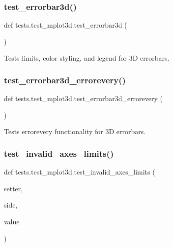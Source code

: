 \subsubsection{\texorpdfstring{test\+\_\+errorbar3d()}{test\_errorbar3d()}}
{\footnotesize\ttfamily def tests.\+test\+\_\+mplot3d.\+test\+\_\+errorbar3d (\begin{DoxyParamCaption}{ }\end{DoxyParamCaption})}

\begin{DoxyVerb}Tests limits, color styling, and legend for 3D errorbars.\end{DoxyVerb}
 \mbox{\label{namespacetests_1_1test__mplot3d_ae7a721e1e0a572fb2a25d6474576ad2e}} 
\subsubsection{\texorpdfstring{test\+\_\+errorbar3d\+\_\+errorevery()}{test\_errorbar3d\_errorevery()}}
{\footnotesize\ttfamily def tests.\+test\+\_\+mplot3d.\+test\+\_\+errorbar3d\+\_\+errorevery (\begin{DoxyParamCaption}{ }\end{DoxyParamCaption})}

\begin{DoxyVerb}Tests errorevery functionality for 3D errorbars.\end{DoxyVerb}
 \mbox{\label{namespacetests_1_1test__mplot3d_ab754faf9cce9f6df2d3d84820a563a3d}} 
\subsubsection{\texorpdfstring{test\+\_\+invalid\+\_\+axes\+\_\+limits()}{test\_invalid\_axes\_limits()}}
{\footnotesize\ttfamily def tests.\+test\+\_\+mplot3d.\+test\+\_\+invalid\+\_\+axes\+\_\+limits (\begin{DoxyParamCaption}\item[{}]{setter,  }\item[{}]{side,  }\item[{}]{value }\end{DoxyParamCaption})}

